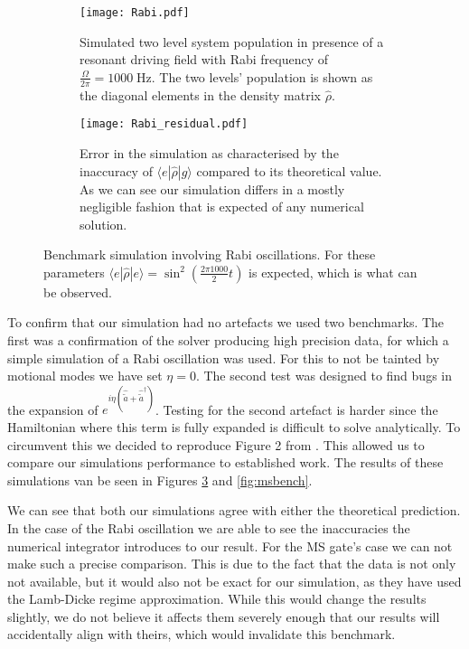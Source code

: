 \documentclass[12pt,twoside]{report}
\begin{document}
\begin{figure}[b!]
	\centering
	\begin{subfigure}[t]{0.475\textwidth}
		\centering
		\texttt{[image: Rabi.pdf]}
		\caption{Simulated two level system population in presence of a resonant driving field with Rabi frequency of $\frac{\Omega}{2\pi} = 1000\;\text{Hz}$. The two levels' population is shown as the diagonal elements in the density matrix $\hat{\rho}$.}
		\label{fig:rabi:measured}
	\end{subfigure}
	\hfill
	\begin{subfigure}[t]{0.475\textwidth}
		\centering
		\texttt{[image: Rabi\_residual.pdf]}
		\caption{Error in the simulation as characterised by the inaccuracy of $\langle e|\hat{\rho}|g\rangle$ compared to its theoretical value. As we can see our simulation differs in a mostly negligible fashion that is expected of any numerical solution.}
		\label{fig:rabi:residual}
	\end{subfigure}
	\caption[Rabi oscillation simulation]{Benchmark simulation involving Rabi oscillations. For these parameters $\langle e|\hat{\rho}|e\rangle = \sin^2\left(\frac{2\pi1000}{2}t\right)$ is expected, which is what can be observed.}
	\label{fig:rabi}
\end{figure}

To confirm that our simulation had no artefacts we used two benchmarks. The first was a confirmation of the solver producing high precision data, for which a simple simulation of a Rabi oscillation was used. For this to not be tainted by motional modes we have set $\eta =0$. The second test was designed to find bugs in the expansion of $e^{i\eta\left(\hat{\tilde{a}}+\hat{\tilde{a}}^\dagger\right)}$. Testing for the second artefact is harder since the Hamiltonian where this term is fully expanded is difficult to solve analytically. To circumvent this we decided to reproduce Figure 2 from \cite{MS_gate}. This allowed us to compare our simulations performance to established work. The results of these simulations van be seen in Figures \ref{fig:rabi} and \ref{fig:msbench}.

We can see that both our simulations agree with either the theoretical prediction. In the case of the Rabi oscillation we are able to see the inaccuracies the numerical integrator introduces to our result. For the MS gate's case we can not make such a precise comparison. This is due to the fact that the data is not only not available, but it would also not be exact for our simulation, as they have used the Lamb-Dicke regime approximation. While this would change the results slightly, we do not believe it affects them severely enough that our results will accidentally align with theirs, which would invalidate this benchmark.
\end{document}
